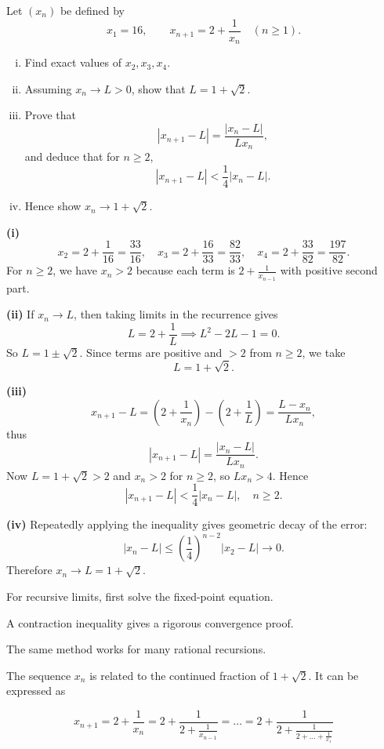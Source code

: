 \begin{problem}
Let $(x_n)$ be defined by
\[
x_1=16,\qquad x_{n+1}=2+\frac{1}{x_n}\quad (n\ge 1).
\]
\begin{enumerate}[(i)]
\item Find exact values of $x_2,x_3,x_4$.
\item Assuming $x_n\to L>0$, show that $L=1+\sqrt{2}$.
\item Prove that
\[
|x_{n+1}-L|=\frac{|x_n-L|}{Lx_n},
\]
and deduce that for $n\ge 2$,
\[
|x_{n+1}-L|<\frac14|x_n-L|.
\]
\item Hence show $x_n\to 1+\sqrt{2}$.
\end{enumerate}
\end{problem}

\begin{solution}
\textbf{(i)}
\[
x_2=2+\frac1{16}=\frac{33}{16},\quad
x_3=2+\frac{16}{33}=\frac{82}{33},\quad
x_4=2+\frac{33}{82}=\frac{197}{82}.
\]
For $n\ge 2$, we have $x_n>2$ because each term is $2+\frac{1}{x_{n-1}}$ with positive second part.

\textbf{(ii)} If $x_n\to L$, then taking limits in the recurrence gives
\[
L=2+\frac1L \implies L^2-2L-1=0.
\]
So $L=1\pm\sqrt2$. Since terms are positive and $>2$ from $n\ge2$, we take
\[
L=1+\sqrt2.
\]

\textbf{(iii)}
\[
x_{n+1}-L=\left(2+\frac1{x_n}\right)-\left(2+\frac1L\right)
=\frac{L-x_n}{Lx_n},
\]
thus
\[
|x_{n+1}-L|=\frac{|x_n-L|}{Lx_n}.
\]
Now $L=1+\sqrt2>2$ and $x_n>2$ for $n\ge2$, so $Lx_n>4$. Hence
\[
|x_{n+1}-L|<\frac14|x_n-L|,\quad n\ge2.
\]

\textbf{(iv)} Repeatedly applying the inequality gives geometric decay of the error:
\[
|x_{n}-L|\le \left(\frac14\right)^{n-2}|x_2-L|\to 0.
\]
Therefore $x_n\to L=1+\sqrt2$.
\end{solution}

\begin{takeaways}
\item For recursive limits, first solve the fixed-point equation.
\item A contraction inequality gives a rigorous convergence proof.
\item The same method works for many rational recursions.
\item The sequence $x_n$ is related to the continued fraction of $1+\sqrt{2}$. It can be expressed as 


\[ x_{n+1} = 2 + \frac{1}{x_n} = 2 + \frac{1}{2 + \frac{1}{x_{n-1}}} = \dots = 2 + \frac{1}{2 + \frac{1}{2 + \dots + \frac{1}{x_1}}} \]


\end{takeaways}

